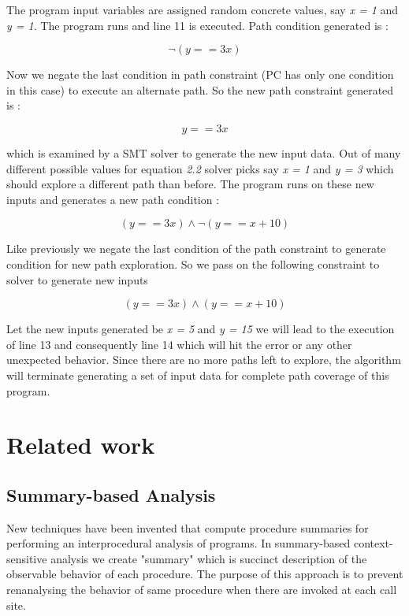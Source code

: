 \documentclass[12pt,oneside]{book}
\begin{document}
The program input variables are assigned random concrete values, say \textit{x = 1} and \textit{y = 1}. The program runs and line 11 is executed. Path condition generated is :

\begin{equation}
\neg(y == 3x)
\end{equation}

Now we negate the last condition in path constraint (PC has only one condition in this case) to execute an alternate path. So the new path constraint generated is :

\begin{equation}
y == 3x
\end{equation}

which is examined by a SMT solver to generate the new input data. Out of many different possible values for equation \textit{2.2} solver picks say \textit{x = 1} and \textit{y = 3} which should explore a different path than before. The program runs on these new inputs and generates a new path condition :

\begin{equation}
(y == 3x) \wedge \neg(y == x + 10)
\end{equation}

Like previously we negate the last condition of the path constraint to generate condition for new path exploration.
So we pass on the following constraint to solver to generate new inputs

\begin{equation}
(y == 3x) \wedge (y == x + 10)
\end{equation}

Let the new inputs generated be \textit{x = 5} and \textit{y = 15} we will lead to the execution of line 13 and consequently line 14 which will hit the error or any other unexpected behavior. Since there are no more paths left to explore, the algorithm will terminate generating a set of input data for complete path coverage of this program.


\section {Related work}


\subsection {Summary-based Analysis}
New techniques have been invented that compute procedure summaries for performing an interprocedural analysis of programs. In summary-based context-sensitive analysis we create "summary" which is succinct description of the observable behavior of each procedure. The purpose of this approach is to prevent renanalysing the behavior of same procedure when there are invoked at each call site.
\end{document}

